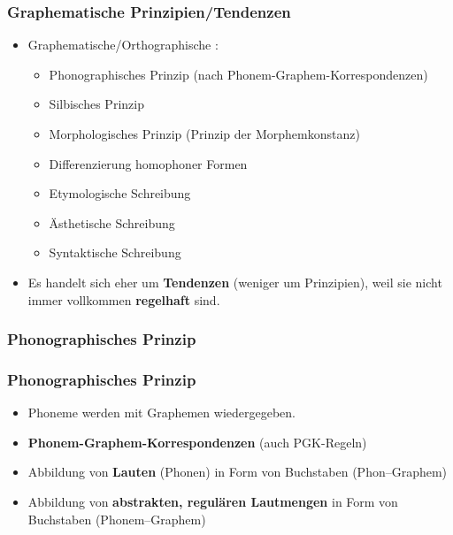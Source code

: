 \begin{frame}
\frametitle{Graphematische Prinzipien/Tendenzen}

\begin{itemize}
	\item Graphematische/Orthographische :
	
	\begin{itemize}
		\item Phonographisches Prinzip (nach Phonem-Graphem-Korrespondenzen)

		\item Silbisches Prinzip

		\item Morphologisches Prinzip (Prinzip der Morphemkonstanz)

		\item Differenzierung homophoner Formen

		\item Etymologische Schreibung

		\item Ästhetische Schreibung 

		\item Syntaktische Schreibung 
	\end{itemize}

\item  Es handelt sich eher um \textbf{Tendenzen} (weniger um Prinzipien), weil sie nicht immer vollkommen \textbf{regelhaft} sind.

\end{itemize}


\end{frame}


\subsubsection{Phonographisches Prinzip}

\begin{frame}
\frametitle{Phonographisches Prinzip}

\begin{itemize}
	\item Phoneme werden mit Graphemen wiedergegeben.
	\item \textbf{Phonem-Graphem-Korrespondenzen} (auch PGK-Regeln)

\pause	

	\item Abbildung von \textbf{Lauten} (Phonen) in Form von Buchstaben (Phon--Graphem)\\ 
	\vs
	\item Abbildung von \textbf{abstrakten, regulären Lautmengen} in
Form von Buchstaben (Phonem--Graphem)

\end{itemize}

\end{frame}


